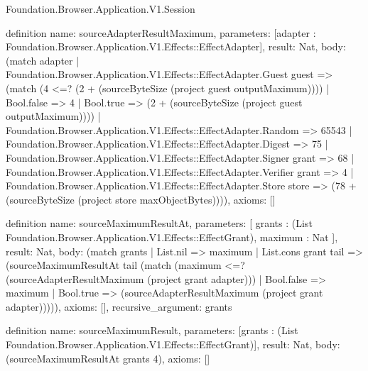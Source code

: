 \begin{lexlean}{Foundation.Browser.Application.V1.Session}
\begin{semanticmodule}
definition{
  name: sourceAdapterResultMaximum,
  parameters: [adapter : Foundation.Browser.Application.V1.Effects::EffectAdapter],
  result: Nat,
  body: (match adapter
    | Foundation.Browser.Application.V1.Effects::EffectAdapter.Guest guest => (match (4 <=? (2 + (sourceByteSize (project guest outputMaximum))))
      | Bool.false => 4
      | Bool.true => (2 + (sourceByteSize (project guest outputMaximum))))
    | Foundation.Browser.Application.V1.Effects::EffectAdapter.Random => 65543
    | Foundation.Browser.Application.V1.Effects::EffectAdapter.Digest => 75
    | Foundation.Browser.Application.V1.Effects::EffectAdapter.Signer grant => 68
    | Foundation.Browser.Application.V1.Effects::EffectAdapter.Verifier grant => 4
    | Foundation.Browser.Application.V1.Effects::EffectAdapter.Store store => (78 + (sourceByteSize (project store maxObjectBytes)))),
  axioms: []
}

definition{
  name: sourceMaximumResultAt,
  parameters: [
    grants : (List Foundation.Browser.Application.V1.Effects::EffectGrant),
    maximum : Nat
  ],
  result: Nat,
  body: (match grants
    | List.nil => maximum
    | List.cons grant tail => (sourceMaximumResultAt tail (match (maximum <=? (sourceAdapterResultMaximum (project grant adapter)))
      | Bool.false => maximum
      | Bool.true => (sourceAdapterResultMaximum (project grant adapter))))),
  axioms: [],
  recursive_argument: grants
}

definition{
  name: sourceMaximumResult,
  parameters: [grants : (List Foundation.Browser.Application.V1.Effects::EffectGrant)],
  result: Nat,
  body: (sourceMaximumResultAt grants 4),
  axioms: []
}


\end{semanticmodule}
\end{lexlean}
